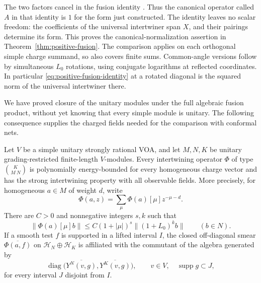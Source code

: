 The two factors cancel in the fusion identity
\cite[Equation~(8.8)]{GuiPositivity}.  Thus the canonical operator
called $A$ in that identity is $1$ for the form just constructed.
The identity leaves no scalar freedom: the coefficients of the
universal intertwiner span $X$, and their pairings determine its form.
This proves the canonical-normalization assertion in
Theorem~\ref{thm:positive-fusion}.  The comparison applies on each
orthogonal simple charge summand, so also covers finite sums.
Common-angle versions follow by simultaneous $L_0$ rotations,
using conjugate logarithms at reflected coordinates.  In
particular \eqref{eq:positive-fusion-identity} at a rotated
diagonal is the squared norm of the universal intertwiner there.

We have proved closure of the unitary modules under the full
algebraic fusion product, without yet knowing that every simple
module is unitary.  The following consequence supplies the
charged fields needed for the comparison with conformal nets.

\begin{corollary}
\label{cor:charged-general}
Let $V$ be a simple unitary strongly rational VOA, and let $M,N,K$
be unitary grading-restricted finite-length $V$-modules.  Every
intertwining operator $\Phi$ of type $\binom{K}{M\ N}$ is
polynomially energy-bounded for every homogeneous charge vector
and has the strong intertwining property with all observable
fields.  More precisely, for homogeneous $a\in M$ of weight $d$,
write
\[
 \Phi(a,z)=\sum_\mu\Phi(a)[\mu]z^{-\mu-d}.
\]
There are $C>0$ and nonnegative integers $s,k$ such that
\[
 \|\Phi(a)[\mu]b\|
 \leq C(1+|\mu|)^s\|(1+L_0)^k b\|
 \qquad(b\in N).
\]
If a smooth test $f$ is supported in a lifted interval $I$, the
closed off-diagonal smear $\overline{\Phi(a,f)}$ on
$\mathcal H_N\oplus\mathcal H_K$ is affiliated with the
commutant of the algebra generated by
\[
 \operatorname{diag}\big(\overline{Y^N(v,g)},
                         \overline{Y^K(v,g)}\big),
 \qquad v\in V,\quad \operatorname{supp}g\subset J,
\]
for every interval $J$ disjoint from $I$.
\end{corollary}

